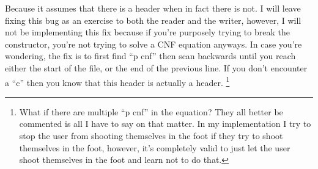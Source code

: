 Because it assumes that there is a header when in fact there is not. I will
leave fixing this bug as an exercise to both the reader and the writer, however,
I will not be implementing this fix because if you're purposely trying to break
the constructor, you're not trying to solve a CNF equation anyways. In case you're 
wondering, the fix is to first find ``p cnf'' then scan backwards until you reach 
either the start of the file, or the end of the previous line. If you don't encounter 
a ``c'' then you know that this header is actually a header.
\footnote{What if there are multiple ``p cnf'' in the equation? They all better be commented is all 
I have to say on that matter. In my implementation I try to stop the user from shooting themselves in 
the foot if they try to shoot themselves in the foot, however, it's completely valid to just let the 
user shoot themselves in the foot and learn not to do that.}